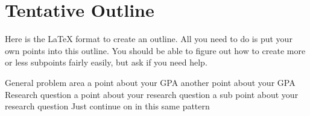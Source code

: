 \documentclass{turabian-researchpaper}
\begin{document}
\section{Tentative Outline}
Here is the \LaTeX{} format to create an outline. All you need to do is put your own points into this outline. You should be able to figure out how to create more or less subpoints fairly easily, but ask if you need help.

\begin{outline}
\1 General problem area
    \2 a point about your GPA
    \2 another point about your GPA
\1 Research question
    \2 a point about your research question
        \3 a sub point about your research question
\1 Just continue on in this same pattern
\end{outline}






\clearpage
\printbibliography
\end{document}
